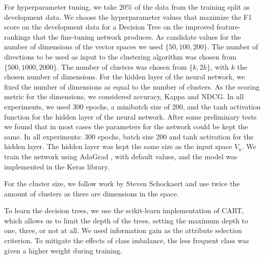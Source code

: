 For hyperparameter tuning, we take 20\% of the data from the training split as development data. %
We choose the hyperparameter values that maximize the F1 score on the development data for a Decision Tree on the improved feature-rankings that the fine-tuning network produces.  As candidate values for the number of dimensions of the vector spaces we used $\{50, 100, 200\}$. The number of directions to be used as input to the clustering algorithm was chosen from $\{500, 1000, 2000\}$. The number of clusters was chosen from $\{k,2k\}$, with $k$ the chosen number of dimensions. For the hidden layer of the neural network, we fixed the number of dimensions as equal to the number of clusters. As the scoring metric for the dimensions, we considered accuracy, Kappa and NDCG. In all experiments, we used 300 epochs, a minibatch size of 200, and the tanh activation function for the hidden layer of the neural network.
After some preliminary tests we found that in most cases the parameters for the network could be kept the same. In all experiments: 300 epochs,  batch size 200 and tanh activation for the hidden layer. The hidden layer was kept the same size as the input space $V_n$. 
We train the network using AdaGrad \cite{Duchi2011}, with default values, and the model was implemented in the Keras library. %

For the cluster size, we follow work by Steven Schockaert\cite{DBLP:conf/ijcai/SchockaertL15} and use twice the amount of clusters as there are dimensions in the space. %

To learn the decision trees, we use the scikit-learn implementation of CART, which allows us to limit the depth of the trees.
setting the maximum depth to one, three, or not at all. We used information gain as the attribute selection criterion. 
To mitigate the effects of class imbalance, the less frequent class was given a higher weight during training.  


